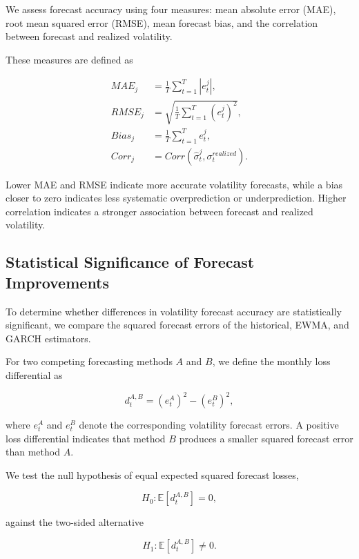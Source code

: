 \documentclass[11pt]{article}
\begin{document}
We assess forecast accuracy using four measures:
mean absolute error (MAE), root mean squared error
(RMSE), mean forecast bias, and the correlation
between forecast and realized volatility.

These measures are defined as

\begin{align}
MAE_j
&=
\frac{1}{T}
\sum_{t=1}^{T}|e_t^j|,
\\[6pt]
RMSE_j
&=
\sqrt{
\frac{1}{T}
\sum_{t=1}^{T}(e_t^j)^2
},
\\[6pt]
Bias_j
&=
\frac{1}{T}
\sum_{t=1}^{T}e_t^j,
\\[6pt]
Corr_j
&=
Corr(
\widehat{\sigma}_{t}^{j},
\sigma_t^{realized}
).
\end{align}

Lower MAE and RMSE indicate more accurate volatility
forecasts, while a bias closer to zero indicates
less systematic overprediction or underprediction.
Higher correlation indicates a stronger association
between forecast and realized volatility.


\subsection{Statistical Significance of Forecast Improvements}

To determine whether differences in volatility forecast
accuracy are statistically significant, we compare the
squared forecast errors of the historical, EWMA, and
GARCH estimators.

For two competing forecasting methods $A$ and $B$,
we define the monthly loss differential as

\begin{equation}
    d_t^{A,B}
    =
    (e_t^A)^2 - (e_t^B)^2,
\end{equation}

where $e_t^A$ and $e_t^B$ denote the corresponding
volatility forecast errors. A positive loss differential
indicates that method $B$ produces a smaller squared
forecast error than method $A$.

We test the null hypothesis of equal expected squared
forecast losses,

\begin{equation}
    H_0: \mathbb{E}[d_t^{A,B}] = 0,
\end{equation}

against the two-sided alternative

\begin{equation}
    H_1: \mathbb{E}[d_t^{A,B}] \neq 0.
\end{equation}
\end{document}

